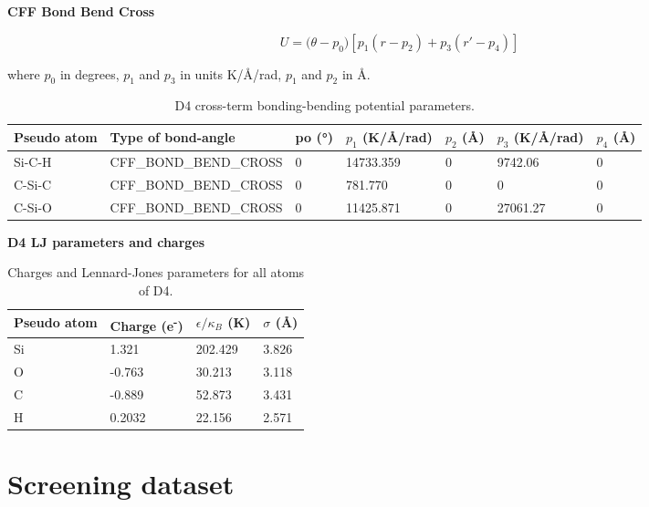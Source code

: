 \pagebreak

\textbf{CFF Bond Bend Cross}

\begin{equation}
    U = {(\theta - p}_{0}) [p_{1}(r - p_{2}) + p_{3}(r\prime - p_{4})]
\end{equation}

where \(p_0\) in degrees, \(p_1\) and \(p_3\) in units K/Å/rad, \(p_1\) and \(p_2\) in Å.

\begin{table}[H]
    \centering
    \caption{%
        D4 cross-term bonding-bending potential parameters.
    }\label{tbl:ff-d4-cross-bondbend}
    \begin{tabular}{@{}lllllll@{}}
        Pseudo atom & Type of bond-angle & po (°) & \(p_1\) (K/Å/rad) & \(p_2\) (Å) & \(p_3\) (K/Å/rad) & \(p_4\) (Å) \\
        \midrule
        Si-C-H & CFF\_BOND\_BEND\_CROSS & 0 & 14733.359 & 0 & 9742.06 & 0\\
        C-Si-C & CFF\_BOND\_BEND\_CROSS & 0 & 781.770 & 0 & 0 & 0\\
        C-Si-O & CFF\_BOND\_BEND\_CROSS & 0 & 11425.871 & 0 & 27061.27 & 0\\
        \bottomrule
    \end{tabular}
\end{table}

\textbf{D4 LJ parameters and charges}

\begin{table}[H]
    \centering
    \caption{%
        Charges and Lennard-Jones parameters for all atoms of D4.
    }\label{tbl:ff-d4-charge}
    \begin{tabular}{@{}llll@{}}
        Pseudo atom & Charge (e\textsuperscript{-}) & \(\epsilon / \kappa_B\) (K) & \(\sigma\) (Å) \\
        \midrule
        Si & 1.321 & 202.429 & 3.826\\
        O & -0.763 & 30.213 & 3.118\\
        C & -0.889 & 52.873 & 3.431\\
        H & 0.2032 & 22.156 & 2.571\\
        \bottomrule
    \end{tabular}
\end{table}


\section{Screening dataset}\label{si-screening-dataset}

